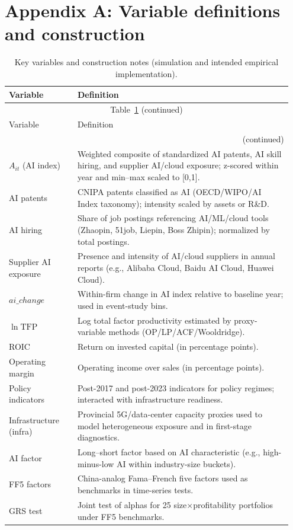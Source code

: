 \section*{Appendix A: Variable definitions and construction}
\begin{longtable}{p{0.23\linewidth} p{0.72\linewidth}}
\caption{Key variables and construction notes (simulation and intended empirical implementation).}\label{tab:variables}\\
\toprule
Variable & Definition \\
\midrule
\endfirsthead
\multicolumn{2}{c}{Table~\ref{tab:variables} (continued)}\\
\toprule
Variable & Definition \\
\midrule
\endhead
\midrule
\multicolumn{2}{r}{(continued)}\\
\bottomrule
\endfoot
\bottomrule
\endlastfoot
$A_{it}$ (AI index) & Weighted composite of standardized AI patents, AI skill hiring, and supplier AI/cloud exposure; z-scored within year and min–max scaled to [0,1]. \\
AI patents & CNIPA patents classified as AI (OECD/WIPO/AI Index taxonomy); intensity scaled by assets or R\&D. \\
AI hiring & Share of job postings referencing AI/ML/cloud tools (Zhaopin, 51job, Liepin, Boss Zhipin); normalized by total postings. \\
Supplier AI exposure & Presence and intensity of AI/cloud suppliers in annual reports (e.g., Alibaba Cloud, Baidu AI Cloud, Huawei Cloud). \\
$ai\_change$ & Within-firm change in AI index relative to baseline year; used in event-study bins. \\
$\ln \mathrm{TFP}$ & Log total factor productivity estimated by proxy-variable methods (OP/LP/ACF/Wooldridge). \\
ROIC & Return on invested capital (in percentage points). \\
Operating margin & Operating income over sales (in percentage points). \\
Policy indicators & Post-2017 and post-2023 indicators for policy regimes; interacted with infrastructure readiness. \\
Infrastructure (infra) & Provincial 5G/data-center capacity proxies used to model heterogeneous exposure and in first-stage diagnostics. \\
AI factor & Long–short factor based on AI characteristic (e.g., high-minus-low AI within industry-size buckets). \\
FF5 factors & China-analog Fama–French five factors used as benchmarks in time-series tests. \\
GRS test & Joint test of alphas for 25 size$\times$profitability portfolios under FF5 benchmarks. \\
\end{longtable}





